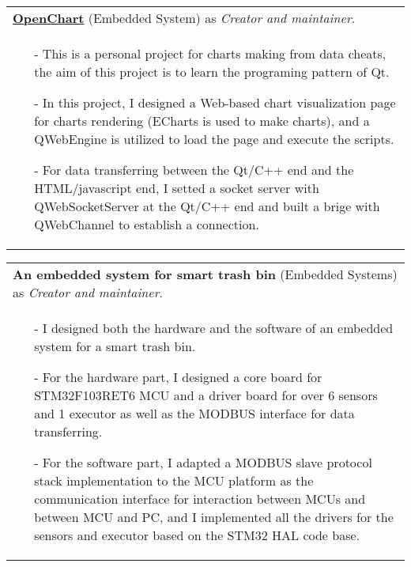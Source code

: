 \documentclass[a4paper,12pt]{article}
\newcommand{\signed}[1]{%
\unskip\nobreak\hfil\penalty50
   \hskip2em\hbox{}\nobreak\hfil#1
   \parfillskip=0pt \finalhyphendemerits=0 }
\begin{document}
\begin{tabularx}{\linewidth}{ @{}X@{} }
    \href{https://github.com/leonezz/OpenChart.git}{\textbf{OpenChart}} (Embedded System) as \textit{Creator and maintainer}.
    \signed{Jun. 2019 - Dec. 2019} \\[3.75pt]
    \begin{minipage}[t]{\linewidth}
        \begin{itemize}[nosep,after=\strut, leftmargin=1em, itemsep=3pt]
            \item[-] This is a personal project for charts making from data cheats, the aim of this project is to learn the programing pattern of Qt.
            \item[-] In this project, I designed a Web-based chart visualization page for charts rendering (ECharts is used to make charts),
            and a QWebEngine is utilized to load the page and execute the scripts.
            \item[-] For data transferring between the Qt/C++ end and the HTML/javascript end, I setted a socket server with QWebSocketServer
            at the Qt/C++ end and built a brige with QWebChannel to establish a connection.
        \end{itemize}
        \end{minipage}
\end{tabularx}

\begin{tabularx}{\linewidth}{ @{}X@{} }
    \textbf{An embedded system for smart trash bin} (Embedded Systems) as \textit{Creator and maintainer}.
    \signed{Dec. 2020 - May 2021} \\[3.75pt]
    \begin{minipage}[t]{\linewidth}
        \begin{itemize}[nosep,after=\strut, leftmargin=1em, itemsep=3pt]
            \item[-] I designed both the hardware and the software of an embedded system for a smart trash bin.
            \item[-] For the hardware part, I designed a core board for STM32F103RET6 MCU and a driver board for over 6 sensors
            and 1 executor as well as the MODBUS interface for data transferring.
            \item[-] For the software part, I adapted a MODBUS slave protocol stack implementation to the MCU platform as the communication
            interface for interaction between MCUs and between MCU and PC, and I implemented all the drivers for the sensors and executor
            based on the STM32 HAL code base.
        \end{itemize}
        \end{minipage}
\end{tabularx}
\end{document}

